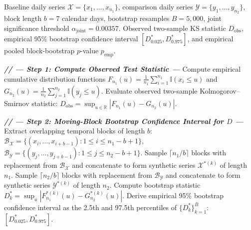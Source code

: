 \bigskip
\begin{algorithm*}[t]
\caption{Moving-Block Bootstrap and Pooled Block-Bootstrap Null Hypothesis Test}
\label{alg:block_bootstrap}
\footnotesize
\begin{algorithmic}[1]
\Require Baseline daily series $\mathcal{X} = \{x_1, \dots, x_{n_1}\}$, comparison daily series $\mathcal{Y} = \{y_1, \dots, y_{n_2}\}$, block length $b = 7$ calendar days, bootstrap resamples $B = 5{,}000$, joint significance threshold $\alpha_{\text{joint}} = 0.00357$.
\Ensure Observed two-sample KS statistic $D_{\text{obs}}$, empirical 95\% bootstrap confidence interval $[D_{0.025}^*, D_{0.975}^*]$, and empirical pooled block-bootstrap $p$-value $p_{\text{emp}}$.

\Statex
\Statex \textbf{\textit{// --- Step 1: Compute Observed Test Statistic ---}}
\State Compute empirical cumulative distribution functions $F_{n_1}(u) = \frac{1}{n_1} \sum_{i=1}^{n_1} \mathbb{I}(x_i \le u)$ and $G_{n_2}(u) = \frac{1}{n_2} \sum_{j=1}^{n_2} \mathbb{I}(y_j \le u)$.
\State Evaluate observed two-sample Kolmogorov--Smirnov statistic:
\Statex \qquad $D_{\text{obs}} = \sup_{u \in \mathbb{R}} |F_{n_1}(u) - G_{n_2}(u)|$.

\Statex
\Statex \textbf{\textit{// --- Step 2: Moving-Block Bootstrap Confidence Interval for $D$ ---}}
\State Extract overlapping temporal blocks of length $b$:
\Statex \qquad $\mathcal{B}_{\mathcal{X}} = \{ (x_i, \dots, x_{i+b-1}) : 1 \le i \le n_1 - b + 1 \}$, \quad $\mathcal{B}_{\mathcal{Y}} = \{ (y_j, \dots, y_{j+b-1}) : 1 \le j \le n_2 - b + 1 \}$.
    \State Sample $\lceil n_1 / b \rceil$ blocks with replacement from $\mathcal{B}_{\mathcal{X}}$ and concatenate to form synthetic series $\mathcal{X}^{*(k)}$ of length $n_1$.
    \State Sample $\lceil n_2 / b \rceil$ blocks with replacement from $\mathcal{B}_{\mathcal{Y}}$ and concatenate to form synthetic series $\mathcal{Y}^{*(k)}$ of length $n_2$.
    \State Compute bootstrap statistic $D_k^* = \sup_{u} |F_{n_1}^{*(k)}(u) - G_{n_2}^{*(k)}(u)|$.
\EndFor
\State Derive empirical 95\% bootstrap confidence interval as the 2.5th and 97.5th percentiles of $\{D_k^*\}_{k=1}^B$: $[D_{0.025}^*, D_{0.975}^*]$.


\end{algorithmic}
\end{algorithm*}
